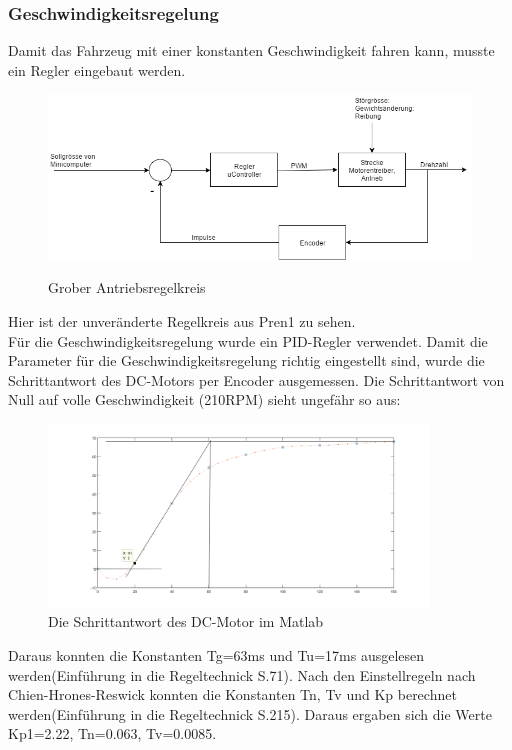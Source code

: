 \subsubsection{Geschwindigkeitsregelung}
Damit das Fahrzeug mit einer konstanten Geschwindigkeit fahren kann, musste ein Regler eingebaut werden.
\begin{figure}[H]
	\centering
	\includegraphics[width=1\textwidth]{03_Loesungskonzept/pictures/Gesch_Regelung.png}
	\label{Regelung_Gesch}
	\caption{Grober Antriebsregelkreis}
\end{figure}
Hier ist der unveränderte Regelkreis aus Pren1 zu sehen.\\Für die Geschwindigkeitsregelung wurde ein PID-Regler verwendet. Damit die Parameter für die Geschwindigkeitsregelung richtig eingestellt sind, wurde die Schrittantwort des DC-Motors per Encoder ausgemessen. Die Schrittantwort von Null auf volle Geschwindigkeit (210RPM) sieht ungefähr so aus:
\begin{figure}[H]%
\centering
\includegraphics[width=0.9\textwidth]{03_Loesungskonzept/pictures/Sprungantwort.png}
\caption{Die Schrittantwort des DC-Motor im Matlab}
\label{fig:schrittantwort}
\end{figure}
Daraus konnten die Konstanten Tg=63ms und Tu=17ms ausgelesen werden(Einführung in die Regeltechnick S.71). Nach den Einstellregeln nach Chien-Hrones-Reswick konnten die Konstanten Tn, Tv und Kp berechnet werden(Einführung in die Regeltechnick S.215). Daraus ergaben sich die Werte Kp1=2.22, Tn=0.063, Tv=0.0085.
